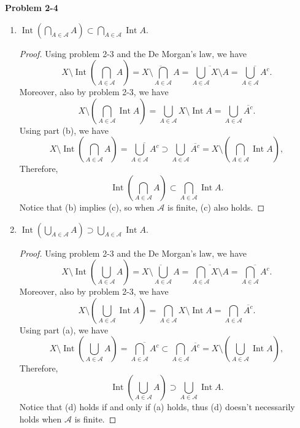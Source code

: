 \documentclass[12pt, a4paper]{article}
\theoremstyle{plain}
\newcommand{\A}{\mathscr{A}}
\DeclareMathOperator{\inter}{Int}
\newenvironment{problem}[2][Problem]
    { \begin{mdframed}[backgroundcolor=gray!20] \textbf{#1 #2} \\}
    {  \end{mdframed}}
\begin{document}
\begin{problem}{2-4}
\begin{enumerate}[label=(\alph*)]
\item $\inter{\left(\bigcap_{A\in\A}A\right)}\subset \bigcap_{A\in\A}\inter{A}$.
	\begin{proof}
Using problem 2-3 and the De Morgan's law, we have
	\[
	X\setminus \inter{\left(\bigcap_{A\in\A}A\right)}=\overline{X\setminus\bigcap_{A\in\A}A}=\overline{\bigcup_{A\in\A}X\setminus A}=\overline{\bigcup_{A\in\A}A^c}.
	\]
	Moreover, also by problem 2-3, we have
	\[
	X\setminus \left(\bigcap_{A\in\A}\inter{A}\right)= \bigcup_{A\in\A}X\setminus\inter{A}=\bigcup_{A\in\A}\overline{A^c}.
	\]
	Using part (b), we have
	\[
	X\setminus \inter{\left(\bigcap_{A\in\A}A\right)}=\overline{\bigcup_{A\in\A}A^c}\supset \bigcup_{A\in\A}\overline{A^c}=X\setminus \left(\bigcap_{A\in\A}\inter{A}\right),
	\]
	Therefore, 
	\[
	\inter{\left(\bigcap_{A\in\A}A\right)}\subset \bigcap_{A\in\A}\inter{A}.
	\]
	Notice that (b) implies (c), so when $\A$ is finite, (c) also holds.
	\end{proof}

\item $\inter{\left(\bigcup_{A\in\A}A\right)}\supset \bigcup_{A\in\A}\inter{A}$.
	\begin{proof}
	Using problem 2-3 and the De Morgan's law, we have
	\[
	X\setminus \inter{\left(\bigcup_{A\in\A}A\right)}=\overline{X\setminus\bigcup_{A\in\A}A}=\overline{\bigcap_{A\in\A}X\setminus A}=\overline{\bigcap_{A\in\A}A^c}.
	\]
	Moreover, also by problem 2-3, we have
	\[
	X\setminus \left(\bigcup_{A\in\A}\inter{A}\right)= \bigcap_{A\in\A}X\setminus\inter{A}=\bigcap_{A\in\A}\overline{A^c}.
	\]
	Using part (a), we have
	\[
	X\setminus \inter{\left(\bigcup_{A\in\A}A\right)}=\overline{\bigcap_{A\in\A}A^c}\subset \bigcap_{A\in\A}\overline{A^c}=X\setminus \left(\bigcup_{A\in\A}\inter{A}\right),
	\]
	Therefore, 
	\[
	\inter{\left(\bigcup_{A\in\A}A\right)}\supset \bigcup_{A\in\A}\inter{A}.
	\]
	Notice that (d) holds if and only if (a) holds, thus (d) doesn't necessarily holds when $\A$ is finite. 
	\end{proof}
\end{enumerate}
\end{problem}
\end{document}
